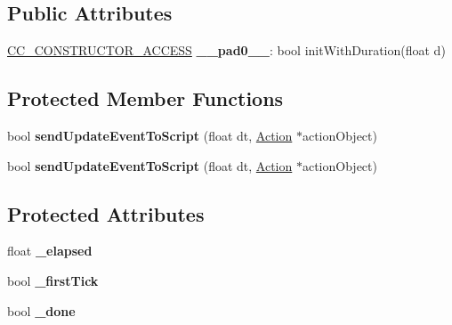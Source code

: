 \subsection*{Public Attributes}
\begin{DoxyCompactItemize}
\item 
\mbox{\label{classActionInterval_aa3025e81a837af48af633a333258e2a1}} 
\hyperlink{_2cocos2d_2cocos_2base_2ccConfig_8h_a25ef1314f97c35a2ed3d029b0ead6da0}{C\+C\+\_\+\+C\+O\+N\+S\+T\+R\+U\+C\+T\+O\+R\+\_\+\+A\+C\+C\+E\+SS} {\bfseries \+\_\+\+\_\+pad0\+\_\+\+\_\+}\+: bool init\+With\+Duration(float d)
\end{DoxyCompactItemize}
\subsection*{Protected Member Functions}
\begin{DoxyCompactItemize}
\item 
\mbox{\label{classActionInterval_a507f9c2b4e2e06f9a093a91502dd69a2}} 
bool {\bfseries send\+Update\+Event\+To\+Script} (float dt, \hyperlink{classAction}{Action} $\ast$action\+Object)
\item 
\mbox{\label{classActionInterval_a507f9c2b4e2e06f9a093a91502dd69a2}} 
bool {\bfseries send\+Update\+Event\+To\+Script} (float dt, \hyperlink{classAction}{Action} $\ast$action\+Object)
\end{DoxyCompactItemize}
\subsection*{Protected Attributes}
\begin{DoxyCompactItemize}
\item 
\mbox{\label{classActionInterval_a302a0213670acf65516e78d1ba9db9ba}} 
float {\bfseries \+\_\+elapsed}
\item 
\mbox{\label{classActionInterval_a1fb2ef4f5ebddb344a019829254db7b5}} 
bool {\bfseries \+\_\+first\+Tick}
\item 
\mbox{\label{classActionInterval_aa97bb4eebb0fddba44dd50dcd28fe866}} 
bool {\bfseries \+\_\+done}
\end{DoxyCompactItemize}
